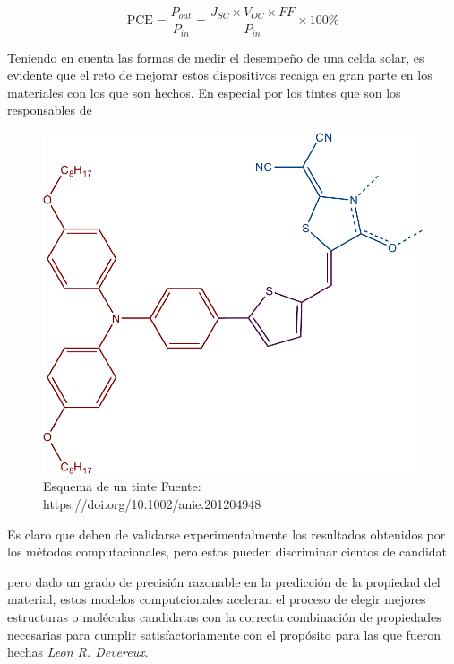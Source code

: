 \begin{equation}
    \text{PCE} = \frac{P_{out}}{P_{in}}  =\frac{J_{SC}\times V_{OC} \times FF}{P_{in}} \times 100\%
    \label{eqn:pce}
\end{equation}

Teniendo en cuenta las formas de medir el desempeño de una celda solar, es evidente que el reto de mejorar estos dispositivos recaiga en gran parte en los materiales con los que son hechos. En especial por los tintes que son los responsables de 

\begin{figure}[h!]
    \begin{center}
        \includegraphics[scale=0.5]{img/dye_scheme.pdf}
    \end{center}
    \caption{Esquema de un tinte Fuente: https://doi.org/10.1002/anie.201204948}
    \label{img:tinte}
\end{figure}


Es claro que deben de validarse experimentalmente los resultados obtenidos por los métodos computacionales, pero estos pueden discriminar cientos de candidat


pero dado un grado de precisión razonable  en la predicción de la propiedad del material, estos modelos computcionales aceleran el proceso de elegir mejores estructuras o moléculas candidatas con la correcta combinación de propiedades necesarias para cumplir satisfactoriamente con el propósito para las que fueron hechas \textit{Leon R. Devereux}. 

